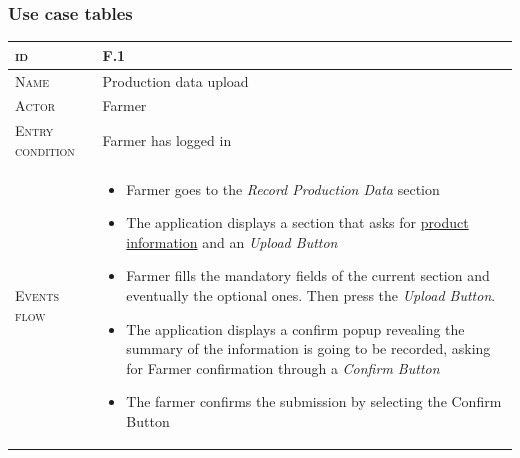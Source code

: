 \subsubsection*{Use case tables}


\begin{table}[H]
    \centering
    \begin{tabular}[c]{|l|m{}|}
        \hline %
    	\textsc{id}                 &   F.1\\
    	\hline %
    	\textsc{Name}               &   Production data upload\\
    	\hline %
    	\textsc{Actor}             &   Farmer\\
    	\hline %
    	\textsc{Entry condition}   &   Farmer has logged in\\
    	\hline %
    	\textsc{Events flow}         &   %
            	                        \begin{itemize}
                                    	    \item Farmer goes to the \textit{Record Production Data} section
                                    		\item The application displays a section that asks for \hyperref[tab:def]{product information} and an \textit{Upload Button}
                                    		\item Farmer fills the mandatory fields of the current section and eventually the optional ones. Then press the \textit{Upload Button}.
                                    		\item The application displays a confirm popup revealing the summary of the information is going to be recorded, asking for Farmer confirmation through a \textit{Confirm Button}
                                    		\item The farmer confirms the submission by selecting the Confirm Button
                                        \end{itemize}\\
        \hline %

\end{tabular}
\end{table}
